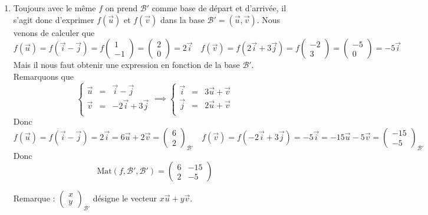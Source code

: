 \documentclass[11pt,a4paper]{article}
\begin{document}
\begin{enumerate}
  \item Toujours avec le même $f$ on prend $\mathcal{B}'$ comme base de départ et d'arrivée,
il s'agit donc d'exprimer $f(\vec{u})$ et $f(\vec{v})$ dans la base $\mathcal{B}'=(\vec{u},\vec{v})$.
Nous venons de calculer que 
$$f(\vec{u})=f(\vec{i}- \vec{j})=f\begin{pmatrix}1\\-1\end{pmatrix} = \begin{pmatrix}2\\0\end{pmatrix}=2\vec{i}
\quad 
f(\vec{v})=f(2\vec{i}+3\vec{j})=f\begin{pmatrix}-2\\3\end{pmatrix} = \begin{pmatrix}-5\\0\end{pmatrix}=-5\vec{i}$$
Mais il  nous faut obtenir une expression en fonction de la base $\mathcal{B}'$.
Remarquons que 
$$\left\{\begin{array}{lcr}
\vec{u} &=& \vec{i}-\vec{j} \\
\vec{v} &=& -2\vec{i}+3\vec{j} \\           
         \end{array}\right.
\implies
\left\{\begin{array}{lcr}
\vec{i} &=& 3\vec{u}+\vec{v} \\
\vec{j} &=& 2\vec{u}+\vec{v} \\           
         \end{array}\right.$$
Donc 
$$f(\vec{u})=f(\vec{i}- \vec{j})=2\vec{i}=6\vec{u}+2\vec{v} = \begin{pmatrix}6\\2\end{pmatrix}_{\mathcal{B}'}
\quad
f(\vec{v})=f(-2\vec{i}+3\vec{j})=-5\vec{i}=-15\vec{u}-5\vec{v} = \begin{pmatrix}-15\\-5\end{pmatrix}_{\mathcal{B}'}$$
Donc
$$\textrm{Mat}(f,\mathcal{B}',\mathcal{B}') = \begin{pmatrix} 6 & -15 \\ 2 & -5 \end{pmatrix}$$

Remarque :
$\begin{pmatrix}x\\y\end{pmatrix}_{\mathcal{B}'}$
désigne le vecteur $x \vec{u}+y\vec{v}$.
\end{enumerate}
\end{document}
